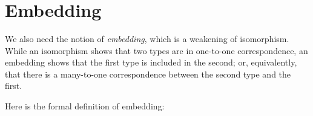 \begin{fence}
\begin{code}
\>[602I]\AgdaSpace{}%
\AgdaSpace{}%
\<%
\\
\>[.][@{}l@{}]\<[602I]%
\>[6]\AgdaComment{-----}\<%
\\
%
\>[4]\AgdaSpace{}%
\AgdaSpace{}%
\AgdaSpace{}%
\<%
\\
%
\>[2]\AgdaSpace{}%
\AgdaSpace{}%
\AgdaSpace{}%
\AgdaSpace{}%
\AgdaSpace{}%
\AgdaSymbol{=}\AgdaSpace{}%
\AgdaSpace{}%
\AgdaSpace{}%
\<%
\\
%
\\[\AgdaEmptyExtraSkip]%
%
\>[2]\AgdaSpace{}%
\AgdaSymbol{:}\AgdaSpace{}%
\AgdaSpace{}%
\AgdaSymbol{(}\AgdaSpace{}%
\AgdaSymbol{:}\AgdaSpace{}%
\AgdaSymbol{)}\<%
\\
\>[2][@{}l@{\AgdaIndent{0}}]%
\>[6]\AgdaComment{-----}\<%
\\
\>[2][@{}l@{\AgdaIndent{0}}]%
\>[4]\AgdaSpace{}%
\AgdaSpace{}%
\AgdaSpace{}%
\<%
\\
%
\>[2]\AgdaSpace{}%
\AgdaSpace{}%
\AgdaSymbol{=}\AgdaSpace{}%
\<%
\\
%
\\[\AgdaEmptyExtraSkip]%
\>[0]\AgdaSpace{}%
\<%
\end{code}
\end{fence}

\hypertarget{embedding}{%
\section{Embedding}\label{embedding}}

We also need the notion of \emph{embedding}, which is a weakening of
isomorphism. While an isomorphism shows that two types are in one-to-one
correspondence, an embedding shows that the first type is included in
the second; or, equivalently, that there is a many-to-one correspondence
between the second type and the first.

Here is the formal definition of embedding:


